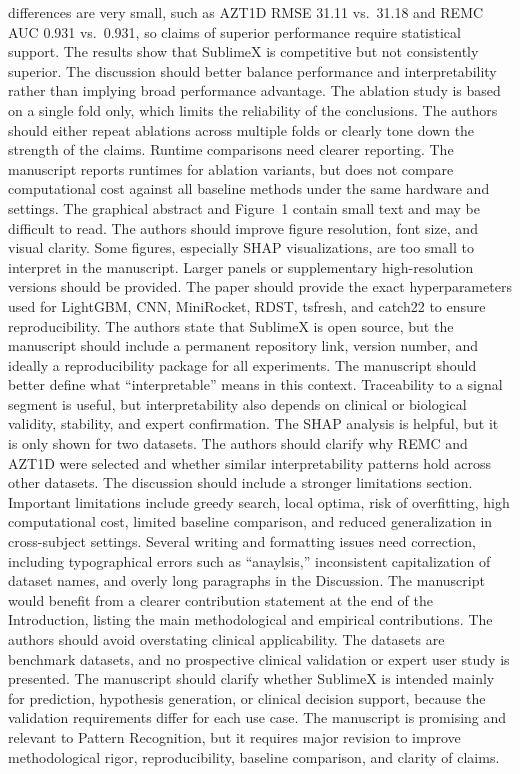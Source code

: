 \documentclass[11pt]{article}
\begin{document}
{differences are very small, such as AZT1D RMSE 31.11 vs.\ 31.18 and REMC AUC 0.931 vs.\ 0.931, so
claims of superior performance require statistical support.
The results show that SublimeX is competitive but not consistently superior. The discussion should
better balance performance and interpretability rather than implying broad performance advantage.
The ablation study is based on a single fold only, which limits the reliability of the
conclusions. The authors should either repeat ablations across multiple folds or clearly tone down
the strength of the claims.
Runtime comparisons need clearer reporting. The manuscript reports runtimes for ablation variants,
but does not compare computational cost against all baseline methods under the same hardware and
settings.
The graphical abstract and Figure~1 contain small text and may be difficult to read. The authors
should improve figure resolution, font size, and visual clarity.
Some figures, especially SHAP visualizations, are too small to interpret in the manuscript.
Larger panels or supplementary high-resolution versions should be provided.
The paper should provide the exact hyperparameters used for LightGBM, CNN, MiniRocket, RDST,
tsfresh, and catch22 to ensure reproducibility.
The authors state that SublimeX is open source, but the manuscript should include a permanent
repository link, version number, and ideally a reproducibility package for all experiments.
The manuscript should better define what ``interpretable'' means in this context. Traceability to
a signal segment is useful, but interpretability also depends on clinical or biological validity,
stability, and expert confirmation.
The SHAP analysis is helpful, but it is only shown for two datasets. The authors should clarify
why REMC and AZT1D were selected and whether similar interpretability patterns hold across other
datasets.
The discussion should include a stronger limitations section. Important limitations include greedy
search, local optima, risk of overfitting, high computational cost, limited baseline comparison,
and reduced generalization in cross-subject settings.
Several writing and formatting issues need correction, including typographical errors such as
``anaylsis,'' inconsistent capitalization of dataset names, and overly long paragraphs in the
Discussion.
The manuscript would benefit from a clearer contribution statement at the end of the
Introduction, listing the main methodological and empirical contributions.
The authors should avoid overstating clinical applicability. The datasets are benchmark datasets,
and no prospective clinical validation or expert user study is presented.
The manuscript should clarify whether SublimeX is intended mainly for prediction, hypothesis
generation, or clinical decision support, because the validation requirements differ for each use
case.
The manuscript is promising and relevant to Pattern Recognition, but it requires major revision
to improve methodological rigor, reproducibility, baseline comparison, and clarity of claims.}
\end{document}

